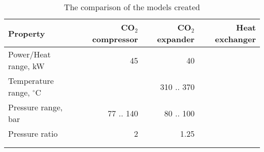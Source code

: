 \begin{table}
\label{tab:DiscussionComparison}
\caption{The comparison of the models created}
\begin{center}
\begin{tabulary}{0.9\textwidth}{LRRR}
\toprule
Property    	                &	CO$_2$ compressor   & CO$_2$	expander    & Heat exchanger    \\
\midrule
Power/Heat range, kW            &       45              &       40              &                   \\
Temperature range, $^\circ$C    &                       &      310 .. 370     &                   \\
Pressure range, bar             &   77 .. 140           &     80 .. 100         &                   \\
Pressure ratio                  &   2                   &        1.25           &                   \\
& & & \\
& & & \\
\bottomrule
\end{tabulary}
\end{center}
\end{table}